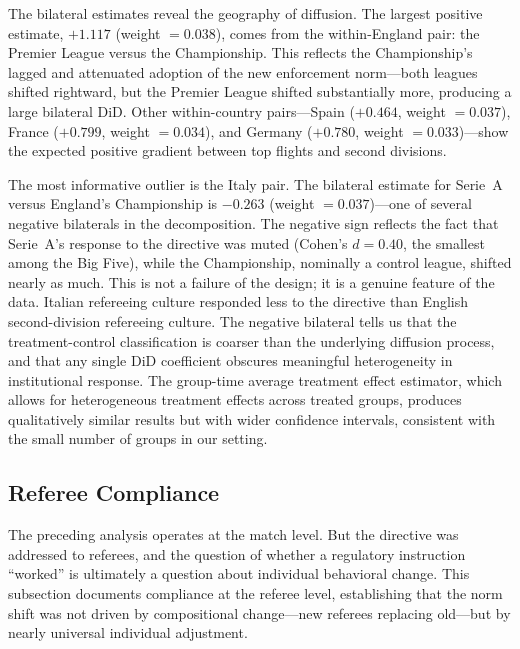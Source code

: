 The bilateral estimates reveal the geography of diffusion. The largest
positive estimate, $+1.117$ (weight $= 0.038$), comes from the
within-England pair: the Premier League versus the Championship. This
reflects the Championship's lagged and attenuated adoption of the new
enforcement norm---both leagues shifted rightward, but the Premier
League shifted substantially more, producing a large bilateral DiD.
Other within-country pairs---Spain ($+0.464$, weight $= 0.037$),
France ($+0.799$, weight $= 0.034$), and Germany ($+0.780$, weight $=
0.033$)---show the expected positive gradient between top flights and
second divisions.

The most informative outlier is the Italy pair. The bilateral estimate
for Serie~A versus England's Championship is $-0.263$ (weight $=
0.037$)---one of several negative bilaterals in the decomposition. The
negative sign reflects the fact that Serie~A's response to the
directive was muted (Cohen's $d = 0.40$, the smallest among the Big
Five), while the Championship, nominally a control league, shifted
nearly as much. This is not a failure of the design; it is a genuine
feature of the data. Italian refereeing culture responded less to
the directive than English second-division refereeing culture. The
negative bilateral tells us that the treatment-control classification
is coarser than the underlying diffusion process, and that any
single DiD coefficient obscures meaningful heterogeneity in
institutional response. The \citet{callaway2021difference}
group-time average treatment effect estimator, which allows for
heterogeneous treatment effects across treated groups, produces
qualitatively similar results but with wider confidence intervals,
consistent with the small number of groups in our setting.


\subsection{Referee Compliance}
\label{sec:compliance}

The preceding analysis operates at the match level. But the directive
was addressed to referees, and the question of whether a regulatory
instruction ``worked'' is ultimately a question about individual
behavioral change. This subsection documents compliance at the referee
level, establishing that the norm shift was not driven by compositional
change---new referees replacing old---but by nearly universal individual
adjustment.

